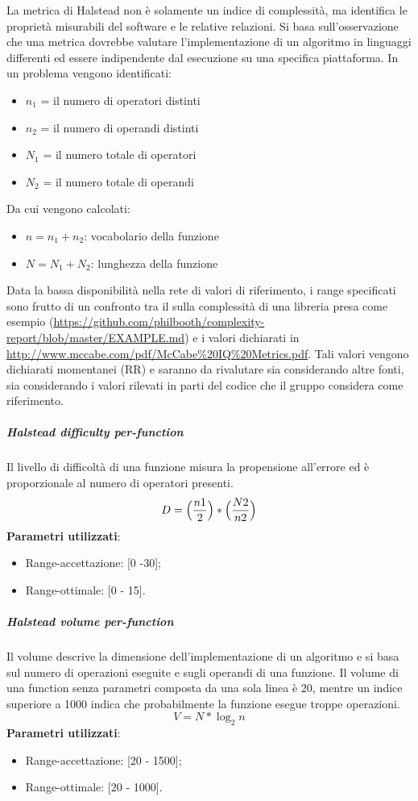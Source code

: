 			La metrica di Halstead non è solamente un indice di complessità, ma identifica le proprietà misurabili del software e le relative relazioni.
			Si basa sull'osservazione che una metrica dovrebbe valutare l'implementazione di un algoritmo in linguaggi differenti ed essere indipendente dal esecuzione su una specifica piattaforma.
			In un problema vengono identificati:
			\begin{itemize}
				\item $n_1$ = il numero di operatori distinti
				\item $n_2$ = il numero di operandi distinti
				\item $N_1$ = il numero totale di operatori
				\item $N_2$ = il numero totale di operandi
			\end{itemize}
			Da cui vengono calcolati:
				\begin{itemize}
				\item $n = n_1 + n_2$: vocabolario della funzione
				\item $N = N_1 + N_2$: lunghezza della funzione
			\end{itemize}
			Data la bassa disponibilità nella rete di valori di riferimento, i range specificati sono frutto di un confronto tra il  sulla complessità di una libreria  presa come esempio (\url{https://github.com/philbooth/complexity-report/blob/master/EXAMPLE.md}) e i valori dichiarati in \url{http://www.mccabe.com/pdf/McCabe\%20IQ\%20Metrics.pdf}. Tali valori vengono dichiarati momentanei (RR) e saranno da rivalutare sia considerando altre fonti, sia considerando i valori rilevati in parti del codice che il gruppo considera come riferimento. %

			
			\subparagraph{Halstead difficulty per-function}
			Il livello di difficoltà di una funzione misura la propensione all'errore ed è proporzionale al numero di operatori presenti. 
			\[
			 D = \Bigl( \frac{n1}{2} \Bigr)  * \Bigl(  \frac{N2}{n2} \Bigr)
			 \]
			\textbf{Parametri utilizzati}:
			\begin{itemize}
				\item Range-accettazione: [0 -30];
				\item Range-ottimale: [0 - 15].
			\end{itemize}
			
			\subparagraph{Halstead volume per-function}
			Il volume descrive la dimensione dell'implementazione di un algoritmo e si basa sul numero di operazioni eseguite e sugli operandi di una funzione. Il volume di una function senza parametri composta da una sola linea è 20, mentre un indice superiore a 1000 indica che probabilmente la funzione esegue troppe operazioni.
			\[
			 V = N * \log_{2}n
			\]
			\textbf{Parametri utilizzati}:
			\begin{itemize}
				\item Range-accettazione: [20 - 1500];
				\item Range-ottimale: [20 - 1000].
			\end{itemize}

